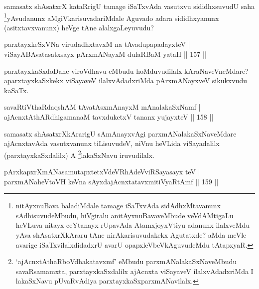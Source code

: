 \begin{artha}
samasatx shAsatxrX kataRrigU tamage iSaTxvAda vasutxvu sididhxsuvudU saha \footnote{nitAyxnuBava baladiMdale tamage iSaTxvAda sidAdhxMtavanunx sAdhisuvudeMbudu, hiVgiralu anitAyxnuBavaveMbude veVdAMtigaLu heVLuva nitayx ceYtanayx rUpavAda AtamxjoyxVtiyu adanunx ilalxveMdu yAva shAsatxrXkAraru tAne nirAkarisuvudakekx Agutatxde? aMda meVle avarige iSaTxvilalxdidadxrU avarU opapxleVbeVkAguvudeMdu tAtapxyaR.}yAvudanunx aMgiVkarisuvadariMdale Aguvado adara sididhxyanunx (asitxtavxvanunx) heVge tAne alalxgaLeyuvudu?
\end{artha}


\begin{shl}
parxtayxkeSxVNa virudadhxtavxM na tAvadupapadayxteV | \\
\footnotemark[1]{}viSayABAvatasatxsayx pArxmANayxM dulaRBaM yataH \hfill||  157 ||  
\end{shl}

\begin{artha}
parxtayxkaSxdoDane viroVdhavu eMbudu hoMduvudilalx kAraNaveVneMdare? aparxtayxkaSxkekx viSayaveV ilalxvAdadxriMda pArxmANayxveV sikukxvudu kaSaTx.
\end{artha}

\begin{shl}
savaRtiVthaRdaqshAM tAvatAsxmAnayxM mAnalakaSxNamf | \\
ajAcnxtAthARdhigamanaM tavxduketxV tananx yujayxteV \hfill||  158 ||  
\end{shl}

\begin{artha}
samasatx shAsatxrXkArarigU sAmAnayxvAgi parxmANalakaSxNaveMdare ajAcnxtavAda vasutxvanunx tiLisuvudeV, niVnu heVLida viSayadalilx (parxtayxkaSxdalilx) A \footnote{`ajAcnxtAthaRboVdhakatavxmf' eMbudu parxmANalakaSxNaveMbudu savaRsamamxta, parxtayxkaSxdalilx ajAcnxta viSayaveV ilalxvAdadxriMda I lakaSxNavu pUvaRvAdiya parxtayxkaSxparxmANavilalx.}lakaSxNavu iruvudilalx.
\end{artha}


\begin{shl}
pArxkapxrXmANasamutapxtetxVdeVRhAdeVviRSayasayx teV | \\
parxmANaheVtoVH keVna sAyxdajAcnxtatavx\footnotemark[3]{}mitiVyaRtAmf \hfill||  159 ||  
\end{shl}

